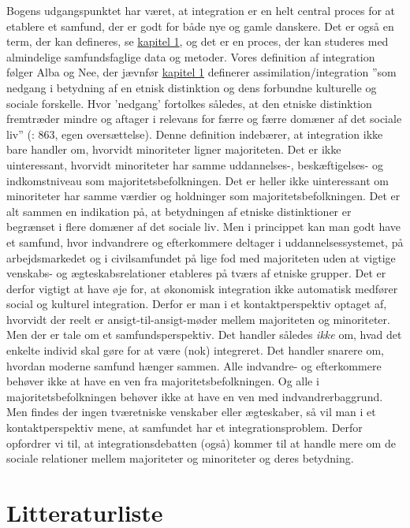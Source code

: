 \documentclass[
]{book}
\begin{document}
Bogens udgangspunktet har været, at integration er en helt central proces for at etablere et samfund, der er godt for både nye og gamle danskere. Det er også en term, der kan defineres, se \hyperref[kap1]{kapitel 1}, og det er en proces, der kan studeres med almindelige samfundsfaglige data og metoder. Vores definition af integration følger Alba og Nee, der jævnfør \hyperref[kap1]{kapitel 1} definerer assimilation/integration ''som nedgang i betydning af en etnisk distinktion og dens forbundne kulturelle og sociale forskelle. Hvor 'nedgang' fortolkes således, at den etniske distinktion fremtræder mindre og aftager i relevans for færre og færre domæner af det sociale liv'' (: 863, egen oversættelse). Denne definition indebærer, at integration ikke bare handler om, hvorvidt minoriteter ligner majoriteten. Det er ikke uinteressant, hvorvidt minoriteter har samme uddannelses-, beskæftigelses- og indkomstniveau som majoritetsbefolkningen. Det er heller ikke uinteressant om minoriteter har samme værdier og holdninger som majoritetsbefolkningen. Det er alt sammen en indikation på, at betydningen af etniske distinktioner er begrænset i flere domæner af det sociale liv. Men i princippet kan man godt have et samfund, hvor indvandrere og efterkommere deltager i uddannelsessystemet, på arbejdsmarkedet og i civilsamfundet på lige fod med majoriteten uden at vigtige venskabs- og ægteskabsrelationer etableres på tværs af etniske grupper. Det er derfor vigtigt at have øje for, at økonomisk integration ikke automatisk medfører social og kulturel integration. Derfor er man i et kontaktperspektiv optaget af, hvorvidt der reelt er ansigt-til-ansigt-møder mellem majoriteten og minoriteter. Men der er tale om et samfundsperspektiv. Det handler således \emph{ikke} om, hvad det enkelte individ skal gøre for at være (nok) integreret. Det handler snarere om, hvordan moderne samfund hænger sammen. Alle indvandre- og efterkommere behøver ikke at have en ven fra majoritetsbefolkningen. Og alle i majoritetsbefolkningen behøver ikke at have en ven med indvandrerbaggrund. Men findes der ingen tværetniske venskaber eller ægteskaber, så vil man i et kontaktperspektiv mene, at samfundet har et integrationsproblem. Derfor opfordrer vi til, at integrationsdebatten (også) kommer til at handle mere om de sociale relationer mellem majoriteter og minoriteter og deres betydning.

\newpage
\thispagestyle{empty}

\chapter*{Litteraturliste}\label{litteraturliste}
\end{document}
